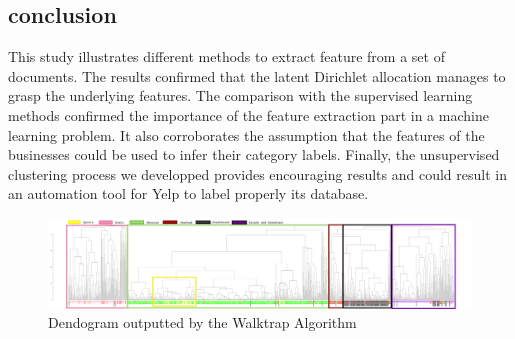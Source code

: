 \documentclass[twoside]{article}
\begin{document}
\begin{multicols}{2}
\section{conclusion}

This study illustrates different methods to extract feature from a set of documents. The results confirmed that the latent Dirichlet allocation manages to grasp the underlying features. The comparison with the supervised learning methods confirmed the importance of the feature extraction part in a machine learning problem. It also corroborates the assumption that the features of the businesses could be used to infer their category labels. Finally, the unsupervised clustering process we developped provides encouraging results and could result in an automation tool for Yelp to label properly its database. 


\nocite{*} %


\end{multicols}

\newpage

\begin{figure}
\centering
\includegraphics[angle=90,width=0.25\linewidth]{img/den_ovi2-1.png}
\caption{Dendogram outputted by the Walktrap Algorithm}
\end{figure}
\end{document}
